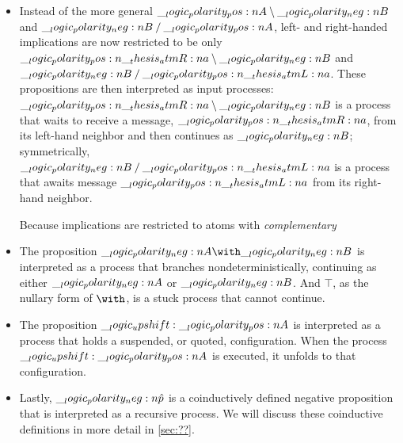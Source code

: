\begin{itemize}
\item
  Instead of the more general $\__logic_polarity_pos:n {A} \mathbin { \setminus } \__logic_polarity_neg:n {B}$ and $\__logic_polarity_neg:n {B} \mathbin { / } \__logic_polarity_pos:n {A}$, left- and right-handed implications are now restricted to be only $\__logic_polarity_pos:n {\__thesis_atmR:n {a}} \mathbin { \setminus } \__logic_polarity_neg:n {B}$ and $\__logic_polarity_neg:n {B} \mathbin { / } \__logic_polarity_pos:n {\__thesis_atmL:n {a}}$.
  These propositions are then interpreted as input processes:
  $\__logic_polarity_pos:n {\__thesis_atmR:n {a}} \mathbin { \setminus } \__logic_polarity_neg:n {B}$ is a process that waits to receive a message, $\__logic_polarity_pos:n {\__thesis_atmR:n {a}}$, from its left-hand neighbor and then continues as $\__logic_polarity_neg:n {B}$; symmetrically, $\__logic_polarity_neg:n {B} \mathbin { / } \__logic_polarity_pos:n {\__thesis_atmL:n {a}}$ is a process that awaits message $\__logic_polarity_pos:n {\__thesis_atmL:n {a}}$ from its right-hand neighbor.

Because implications are restricted to atoms with \emph{complementary}

\item
  The proposition $\n{A} \with \n{B}$ is interpreted as a process that branches nondeterministically, continuing as either $\__logic_polarity_neg:n {A}$ or $\__logic_polarity_neg:n {B}$.
  And $\top$, as the nullary form of $\with$, is a stuck process that cannot continue.

\item
  The proposition $\__logic_upshift: \__logic_polarity_pos:n {A}$ is interpreted as a process that holds a suspended, or quoted, configuration.
  When the process $\__logic_upshift: \__logic_polarity_pos:n {A}$ is executed, it unfolds to that configuration.

\item
  Lastly, $\__logic_polarity_neg:n {\hat{p}}$ is a coinductively defined negative proposition that is interpreted as a recursive process.
  We will discuss these coinductive definitions in more detail in \cref{sec:??}.
\end{itemize}

